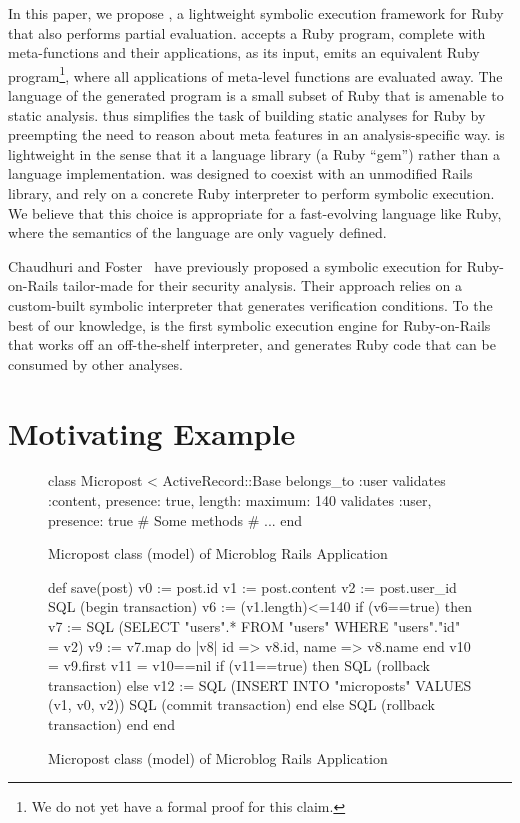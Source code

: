 In this paper, we propose \name, a lightweight symbolic execution
framework for Ruby that also performs partial evaluation. \name
accepts a Ruby program, complete with meta-functions and their
applications, as its input, emits an equivalent Ruby
program\footnote{We do not yet have a formal proof for this claim.},
where all applications of meta-level functions are evaluated away. The
language of the generated program is a small subset of Ruby that is
amenable to static analysis. \name thus simplifies the task of
building static analyses for Ruby by preempting the need to reason
about meta features in an analysis-specific way. \name is lightweight
in the sense that it a language library (a Ruby ``gem'') rather than a
language implementation. \name was designed to coexist with an
unmodified Rails library, and rely on a concrete Ruby interpreter to
perform symbolic execution. We believe that this choice is appropriate
for a fast-evolving language like Ruby, where the semantics of the
language are only vaguely defined.

Chaudhuri and Foster~\cite{Rubyx} have previously proposed a symbolic
execution for Ruby-on-Rails tailor-made for their security analysis.
Their approach relies on a custom-built symbolic interpreter that
generates verification conditions. To the best of our knowledge, \name
is the first symbolic execution engine for Ruby-on-Rails that works
off an off-the-shelf interpreter, and generates Ruby code that can be
consumed by other analyses.

\section{Motivating Example}
\begin{figure}
  \begin{coderuby}
  class Micropost < ActiveRecord::Base
    belongs_to :user
    validates :content, presence: true, 
              length: { maximum: 140 }
    validates :user, presence: true
    # Some methods
    # ...
  end
  \end{coderuby}
\label{fig:postSave}
\caption{Micropost class (model) of Microblog Rails Application}
\end{figure}

\begin{figure}
  \begin{coderuby}
def save(post)
  v0 := post.id
  v1 := post.content
  v2 := post.user_id
  SQL (begin transaction)
  v6 := (v1.length)<=140
  if (v6==true) then
    v7 := SQL (SELECT  "users".* FROM "users"  
                WHERE "users"."id" = v2)
    v9 := v7.map do |v8|
      {id => v8.id, name => v8.name}
    end
    v10 = v9.first
    v11 = v10==nil
    if (v11==true) then
      SQL (rollback transaction)
    else
      v12 := SQL (INSERT INTO "microposts" VALUES (v1, v0, v2))
      SQL (commit transaction)
    end
  else
    SQL (rollback transaction)
  end
end
  \end{coderuby}

\label{fig:addPost}
\caption{Micropost class (model) of Microblog Rails Application}
\end{figure}

